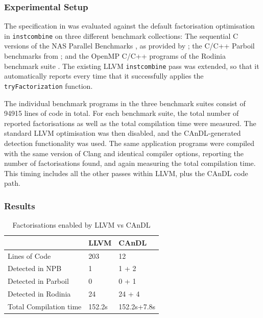 \subsubsection{Experimental Setup}

    The specification in  was evaluated against the default
    factorisation optimisation in \texttt{instcombine} on three different
    benchmark collections:
    The sequential C versions of the NAS Parallel Benchmarks
    \citep{Bailey1991NPB}, as provided by \citet{seo2011performance};
    the C/C++ Parboil benchmarks from \citet{stratton2012parboil};
    and the OpenMP C/C++ programs of the Rodinia benchmark suite
    \citep{Che2009Rodinia}.
    The existing LLVM \texttt{instcombine} pass was extended, so that it
    automatically reports every time that it successfully applies the
    \texttt{tryFactorization} function.  

    The individual benchmark programs in the three benchmark
    suites consist of 94915 lines of code in total.
    For each benchmark suite, the total number of reported factorisations as
    well as the total compilation time were measured.
    The standard LLVM optimisation was then disabled, and the CAnDL-generated
    detection functionality was used.
    The same application programs were compiled with the same version of Clang
    and identical compiler options, reporting the number of factorisations
    found, and again measuring the total compilation time.
    This timing includes all the other passes within LLVM, plus the CAnDL code
    path.

\subsubsection{Results}

\begin{table}[t]
  \centering
  \begin{tabular}{lll}
    \toprule
    & {\bf LLVM} & {\bf CAnDL} \\
    \midrule
    Lines of Code & 203 & 12 \\
    Detected in NPB & 1 & 1 + 2 \\
    Detected in Parboil & 0 & 0 + 1\\
    Detected in Rodinia & 24 & 24 + 4\\
    Total Compilation time & 152.2s & 152.2s+7.8s \\
    \bottomrule
\end{tabular}
\caption{Factorisations enabled by LLVM vs CAnDL}
\label{fig:factorization_results}
\end{table}

